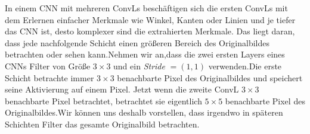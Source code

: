 \documentclass[12pt,a4paper]{scrartcl}
\numberwithin{equation}{section}
\begin{document}
In einem \ac{CNN} mit mehreren \acsp{ConvL} beschäftigen sich die ersten \acsp{ConvL} mit dem Erlernen einfacher Merkmale wie Winkel, Kanten oder Linien und je tiefer das \ac{CNN} ist, desto komplexer sind die extrahierten Merkmale. Das liegt daran, dass jede nachfolgende Schicht einen größeren Bereich des Originalbildes betrachten oder \glqq sehen \grqq{} kann.Nehmen wir an,dass die zwei ersten Layers eines \acsp{CNN} Filter von Größe $ 3\times 3 $  und ein \textit{Stride} $ =(1,1) $ verwenden.Die erste Schicht betrachte immer $ 3\times3 $ benachbarte Pixel des Originalbildes und speichert seine Aktivierung auf einem Pixel. Jetzt wenn die zweite \ac{ConvL}  $ 3\times3 $ benachbarte Pixel betrachtet, betrachtet sie eigentlich  $ 5\times5 $ benachbarte Pixel des Originalbildes.Wir können uns deshalb vorstellen, dass irgendwo in späteren Schichten Filter das gesamte Originalbild betrachten.
 
\end{document}
